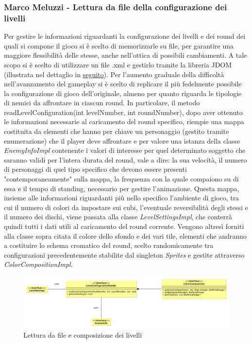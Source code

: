 \documentclass[a4paper,12pt, hidelinks]{report}
\begin{document}
\begin{flushright}
\item\subsubsection{Marco Meluzzi - Lettura da file della configurazione dei livelli}
\end{flushright}

Per gestire le informazioni riguardanti la configurazione dei livelli e dei round dei quali si compone il gioco si è scelto di memorizzarle su file, per garantire una maggiore flessibilità delle stesse, anche nell'ottica di possibili cambiamenti. A tale scopo si è scelto di utilizzare un file .xml e gestirlo tramite la libreria JDOM (illustrata nel dettaglio in \hyperlink{target}{seguito}). Per l'aumento graduale della difficoltà nell'avanzamento del gameplay si è scelto di replicare il più fedelmente possibile la configurazione di gioco dell'originale, almeno per quanto riguarda le tipologie di nemici da affrontare in ciascun round. In particolare, il metodo readLevelConfiguration(int levelNumber, int roundNumber), dopo aver ottenuto le informazioni necessarie al caricamento del round specifico, riempie una mappa costituita da elementi che hanno per chiave un personaggio (gestito tramite enumerazione) che il player deve affrontare e per valore una istanza della classe \emph{EnemyInfoImpl} contenente i valori di interesse per quel determinato soggetto che saranno validi per l'intera durata del round, vale a dire: la sua velocità, il numero di personaggi di quel tipo specifico che devono essere presenti "contemporaneamente" sulla mappa, la frequenza con la quale compaiono su di essa e il tempo di standing, necessario per gestire l'animazione. Questa mappa, insieme alle informazioni riguardanti più nello specifico l'ambiente di gioco, tra cui il numero di colori da impostare sui cubi, l'eventuale reversibilità degli stessi e il numero dei dischi, viene passata alla classe \emph{LevelSettingsImpl}, che conterrà quindi tutti i dati utili al caricamento del round corrente. Vengono altresì forniti alla classe sopra citata il colore dello sfondo e dei vari tile, elementi che andranno a costituire lo schema cromatico del round, scelto randomicamente tra configurazioni precedentemente stabilite dal singleton \emph{Sprites} e gestite attraverso \emph{ColorCompositionImpl}.

\begin{figure}[H]
\centering{}
\includegraphics[width=\linewidth]{img/ComposizioneLivelli}
\caption{Lettura da file e composizione dei livelli}
\label{img:ComposizioneLivelli}
\end{figure}
\end{document}
